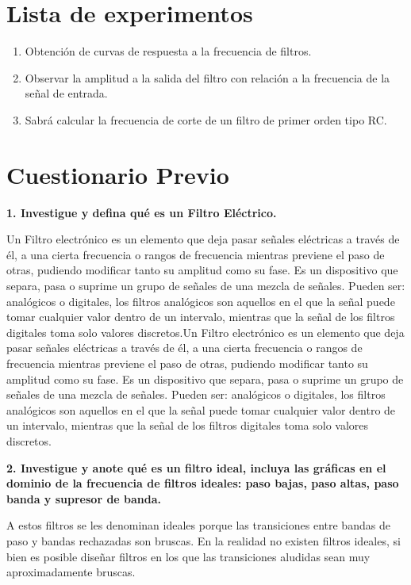 \documentclass[12pt, a4paper]{article}
\begin{document}
\section{Lista de experimentos}
\begin{enumerate}
  \item Obtención de curvas de respuesta a la frecuencia de filtros.
  \item Observar la amplitud a la salida del filtro con relación a la frecuencia de la señal de entrada.
  \item Sabrá calcular la frecuencia de corte de un filtro de primer orden tipo RC.
\end{enumerate}


\section{Cuestionario Previo}

\textbf{1. Investigue y defina qué es un Filtro Eléctrico.}\par 

Un Filtro electrónico es un elemento que deja pasar señales eléctricas a través de él, a una cierta frecuencia o rangos de frecuencia mientras previene el paso de otras, pudiendo modificar tanto su amplitud como su fase. Es un dispositivo que separa, pasa o suprime un grupo de señales de una mezcla de señales.  Pueden ser: analógicos o digitales, los filtros analógicos son aquellos en el que la señal puede tomar cualquier valor dentro de un intervalo, mientras que la señal de los filtros digitales toma solo valores discretos.Un Filtro electrónico es un elemento que deja pasar señales eléctricas a través de él, a una cierta frecuencia o rangos de frecuencia mientras previene el paso de otras, pudiendo modificar tanto su amplitud como su fase. Es un dispositivo que separa, pasa o suprime un grupo de señales de una mezcla de señales.  Pueden ser: analógicos o digitales, los filtros analógicos son aquellos en el que la señal puede tomar cualquier valor dentro de un intervalo, mientras que la señal de los filtros digitales toma solo valores discretos.

\textbf{2. Investigue y anote qué es un filtro ideal, incluya las gráficas en el dominio de la frecuencia de filtros ideales: paso bajas, paso altas, paso banda y supresor de banda.}\par 

A estos filtros se les denominan ideales porque las transiciones entre bandas de paso y bandas rechazadas son bruscas. En la realidad
no existen filtros ideales, si bien es posible diseñar filtros en los que las transiciones
aludidas sean muy aproximadamente bruscas. 
\end{document}
